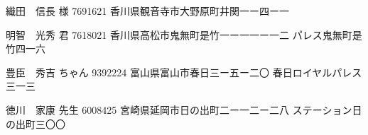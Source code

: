 \documentclass[]{jletteraddress}
\begin{document}
\addaddress
  {織田　信長} {様}    
  {7691621}
  {香川県観音寺市大野原町井関一ー四ー一}    
  {}

\addaddress
  {明智　光秀} {君}    
  {7618021}
  {香川県高松市鬼無町是竹一ー一一ー一二}    
  {パレス鬼無町是竹四一六}

\addaddress
  {豊臣　秀吉} {ちゃん}  
  {9392224}
  {富山県富山市春日三ー五ー二〇}            
  {春日ロイヤルパレス三一三}

\addaddress
  {徳川　家康} {先生}    
  {6008425}
  {宮崎県延岡市日の出町二ー一二ー二八}      
  {ステーション日の出町三〇〇}
\end{document}
